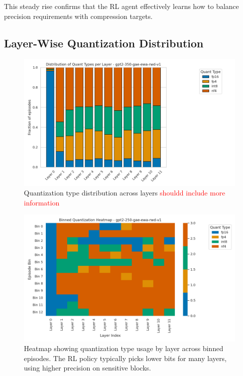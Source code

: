 \documentclass{article}
\newcommand{\red}[1]{\textcolor{red}{#1}}
\begin{document}
	This steady rise confirms that the RL agent effectively learns how to balance precision requirements with compression targets.
	
	\subsection{Layer-Wise Quantization Distribution}
	
	\begin{figure}[ht]
		\centering
		\includegraphics[width=0.93\columnwidth]{gpt2-350-gae-ewa-rwd-v1_quant_dist_bar.png}
		\vspace{-0.4em}
		\caption{\small Quantization type distribution across layers \red{shouldd include more information}}
		\label{fig:bardist}
		\vspace{-0.5em}
	\end{figure}
	
	\begin{figure}[ht]
		\centering
		\includegraphics[width=0.93\columnwidth]{gpt2-250-gae-ewa-rwd-v1_quant_heatmap_binned.png}
		\vspace{-0.4em}
		\caption{\small Heatmap showing quantization type usage by layer across binned episodes. The RL policy typically picks lower bits for many layers, using higher precision on sensitive blocks.}
		\label{fig:bin_heatmap}
		\vspace{-0.5em}
	\end{figure}
	
\end{document}
